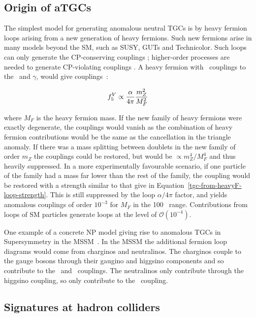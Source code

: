 \subsection{Origin of aTGCs}

The simplest model for generating anomalous neutral TGCs is by heavy fermion
loops arising from a new generation of heavy fermions. Such new fermions arise
in many models beyond the SM, such as SUSY, GUTs and Technicolor.
Such
loops can only generate the CP-conserving couplings \ffiveV; higher-order
processes are needed to generate CP-violating couplings \ffourV. A heavy fermion
with \sm\ couplings to the \Z\ and $\gamma$, would give couplings~\cite{Gounaris:2000tb}:

\begin{align}
\ffiveV \propto \frac{\alpha}{4\pi} \frac{m_{Z}^{2}}{M_{F}^{2}}
\label{tgc-from-heavyF-loop-strength}
\end{align}

where $M_{F}$ is the heavy fermion mass. If the new family of heavy fermions
were exactly degenerate, the couplings would vanish as the combination of heavy
fermion contributions would be the same as the cancellation in the triangle
anomaly. If there was a mass splitting between doublets in the new family of
order $m_{Z}$ the couplings could be restored, but would be $\propto
m_{Z}^{4} / M_{F}^{4}$ and thus heavily suppressed. In a more
experimentally favourable scenario, if one particle of the family had a mass far
lower than the rest of the family, the coupling would be restored with a
strength similar to that give in Equation~\ref{tgc-from-heavyF-loop-strength}.
This is still suppressed by the loop $\alpha / 4\pi$ factor, and yields
anomalous couplings of order $10^{-3}$ for $M_F$ in the 100 \gev\ range.
Contributions from loops
of SM particles generate loops at the level of $\mathcal{O}(10^{-4})$. 

One example of a concrete NP model giving rise to anomalous TGCs in
Supersymmetry in the MSSM~\cite{Gounaris:2000tb}. In the MSSM the
additional fermion loop diagrams would come from charginos and neutralinos. The
charginos couple to the gauge bosons through their gaugino and higgsino
components and so contribute to the \ffiveZ\ and \ffiveg\ couplings. The
neutralinos only contribute through the higgsino coupling, so only
contribute to the \ffiveZ\ coupling.

\subsection{Signatures at hadron colliders}

